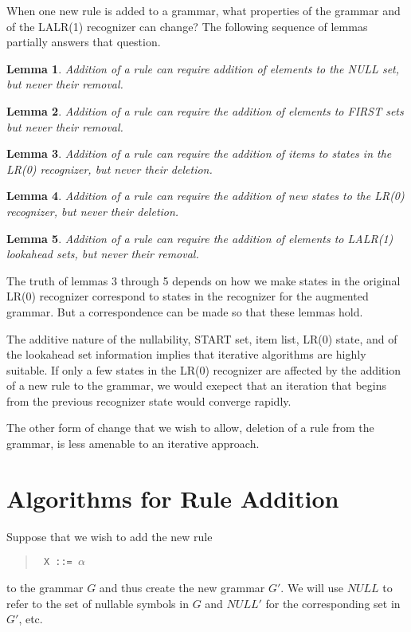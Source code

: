 When one new rule is added to a grammar, what properties of the
grammar and of the LALR(1) recognizer can change?
The following sequence of lemmas partially answers that question.
\newtheorem{lemma}{Lemma}
\begin{lemma}
Addition of a rule can require addition of elements to the NULL set,
but never their removal.
\end{lemma}
\begin{lemma}
Addition of a rule can require the addition of elements to FIRST sets
but never their removal.
\end{lemma}
\begin{lemma}
Addition of a rule can require the addition of items to states
in the LR(0) recognizer, but never their deletion.
\end{lemma}
\begin{lemma}
Addition of a rule can require the addition of new states to the
LR(0) recognizer, but never their deletion.
\end{lemma}
\begin{lemma}
Addition of a rule can require the addition of elements to
LALR(1) lookahead sets, but never their removal.
\end{lemma}
The truth of lemmas 3 through 5 depends on how we make states in the
original LR(0) recognizer correspond to states in the recognizer for
the augmented grammar.
But a correspondence can be made so that these lemmas hold.

The additive nature of the nullability, START set, item list,
LR(0) state,
and of the lookahead set information implies that iterative algorithms
are highly suitable.
If only a few states in the LR(0) recognizer are affected by the
addition of a new rule to the grammar, we would exepect that
an iteration that begins from the previous recognizer state
would converge rapidly.
     
The other form of change that we wish to allow, deletion of a
rule from the grammar, is less amenable to an iterative approach.

\section{Algorithms for Rule Addition}

Suppose that we wish to add the new rule
\begin{quote}
\tt
X  ::=  $\alpha$
\end{quote}
to the grammar $G$ and thus create the new grammar $G'$.
We will use $NULL$ to refer to the set of nullable symbols in $G$
and $NULL'$ for the corresponding set in $G'$, etc.

